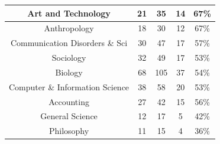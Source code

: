 \documentclass[10pt]{article}
\begin{document}
\begin{longtable}[c]{|ccccc|}
	\multicolumn{1}{|c|}{Art and Technology}                         & \multicolumn{1}{c|}{21}                              & \multicolumn{1}{c|}{35}                                  & \multicolumn{1}{c|}{14}                 & 67\%                  \\ \hline
	\multicolumn{1}{|c|}{Anthropology}                               & \multicolumn{1}{c|}{18}                              & \multicolumn{1}{c|}{30}                                  & \multicolumn{1}{c|}{12}                 & 67\%                  \\ \hline
	\multicolumn{1}{|c|}{Communication Disorders \& Sci}             & \multicolumn{1}{c|}{30}                              & \multicolumn{1}{c|}{47}                                  & \multicolumn{1}{c|}{17}                 & 57\%                  \\ \hline
	\multicolumn{1}{|c|}{Sociology}                                  & \multicolumn{1}{c|}{32}                              & \multicolumn{1}{c|}{49}                                  & \multicolumn{1}{c|}{17}                 & 53\%                  \\ \hline
	\multicolumn{1}{|c|}{Biology}                                    & \multicolumn{1}{c|}{68}                              & \multicolumn{1}{c|}{105}                                 & \multicolumn{1}{c|}{37}                 & 54\%                  \\ \hline
	\multicolumn{1}{|c|}{Computer \& Information Science}            & \multicolumn{1}{c|}{38}                              & \multicolumn{1}{c|}{58}                                  & \multicolumn{1}{c|}{20}                 & 53\%                  \\ \hline
	\multicolumn{1}{|c|}{Accounting}                                 & \multicolumn{1}{c|}{27}                              & \multicolumn{1}{c|}{42}                                  & \multicolumn{1}{c|}{15}                 & 56\%                  \\ \hline
	\multicolumn{1}{|c|}{General Science}                            & \multicolumn{1}{c|}{12}                              & \multicolumn{1}{c|}{17}                                  & \multicolumn{1}{c|}{5}                  & 42\%                  \\ \hline
	\multicolumn{1}{|c|}{Philosophy}                                 & \multicolumn{1}{c|}{11}                              & \multicolumn{1}{c|}{15}                                  & \multicolumn{1}{c|}{4}                  & 36\%                  \\ \hline

\end{longtable}
\end{document}
